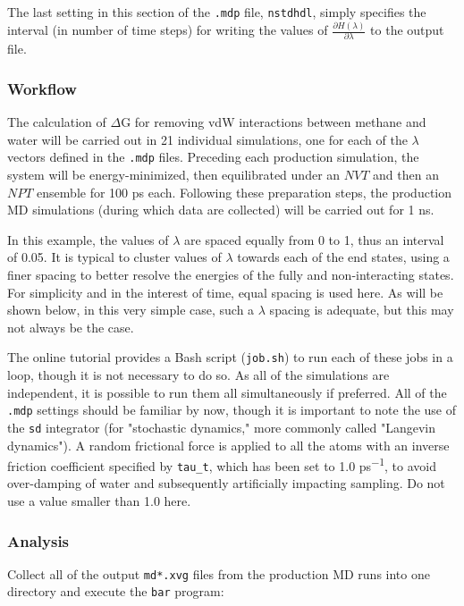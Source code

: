 \documentclass[9pt,tutorial,pubversion]{livecoms}
\begin{document}
The last setting in this section of the \texttt{.mdp} file, \texttt{nstdhdl}, simply specifies the interval (in number of time steps) for writing the values of $\frac{\partial H(\lambda)}{\partial \lambda}$ to the output file.

\subsubsection{Workflow} \label{fes_workflow}

The calculation of $\Delta$G for removing vdW interactions between methane and water will be carried out in 21 individual simulations, one for each of the $\lambda$ vectors defined in the \texttt{.mdp} files. Preceding each production simulation, the system will be energy-minimized, then equilibrated under an $NVT$ and then an $NPT$ ensemble for 100 ps each. Following these preparation steps, the production MD simulations (during which data are collected) will be carried out for 1 ns.

In this example, the values of $\lambda$ are spaced equally from 0 to 1, thus an interval of 0.05. It is typical to cluster values of $\lambda$ towards each of the end states, using a finer spacing to better resolve the energies of the fully and non-interacting states. For simplicity and in the interest of time, equal spacing is used here. As will be shown below, in this very simple case, such a $\lambda$ spacing is adequate, but this may not always be the case.

The online tutorial provides a Bash script (\texttt{job.sh}) to run each of these jobs in a loop, though it is not necessary to do so. As all of the simulations are independent, it is possible to run them all simultaneously if preferred. All of the \texttt{.mdp} settings should be familiar by now, though it is important to note the use of the \texttt{sd} integrator (for "stochastic dynamics," more commonly called "Langevin dynamics"). A random frictional force is applied to all the atoms with an inverse friction coefficient specified by \texttt{tau\_t}, which has been set to 1.0 ps\textsuperscript{$-$1}, to avoid over-damping of water and subsequently artificially impacting sampling. Do not use a value smaller than 1.0 here.

\subsubsection{Analysis} \label{fes_ana}

Collect all of the output \texttt{md*.xvg} files from the production MD runs into one directory and execute the \texttt{bar} program:
\end{document}
